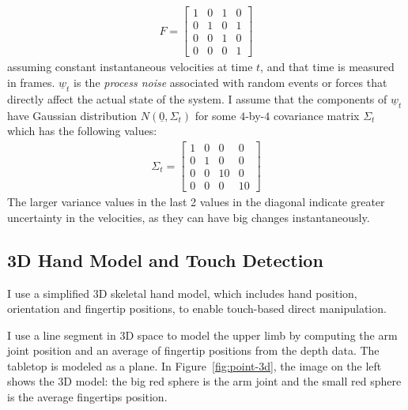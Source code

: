 \begin{align*}
F = \begin{bmatrix}
  1 & 0 & 1 & 0 \\
  0 & 1 & 0 & 1 \\
  0 & 0 & 1 & 0 \\
  0 & 0 & 0 & 1 \end{bmatrix}
\end{align*}
assuming constant instantaneous velocities at time $t$, and that time is
measured in frames.
$\underline{w}_t$ is the \textit{process noise} associated with random events or
forces that directly affect the actual state of the system. I assume that the 
components of $\underline{w}_t$ have Gaussian distribution $N(\underline{0},
\Sigma_t)$ for some $4$-by-$4$ covariance matrix $\Sigma_t$ which has the
following values:
\begin{align*}
\Sigma_t = \begin{bmatrix}
  1 & 0 & 0 & 0 \\
  0 & 1 & 0 & 0 \\
  0 & 0 & 10 & 0 \\
  0 & 0 & 0 & 10 
  \end{bmatrix}
\end{align*}
The larger variance values in the last 2 values in the diagonal indicate
greater uncertainty in the velocities, as they can have big changes
instantaneously.

\subsection{3D Hand Model and Touch Detection}
I use a simplified 3D
skeletal hand model, which includes hand position, orientation and
fingertip positions, to enable touch-based direct manipulation. 

I use a line segment in 3D space to model the upper limb by computing the arm
joint position and an average of fingertip positions from the depth data. The
tabletop is modeled as a plane. In Figure~\ref{fig:point-3d}, the image on the
left shows the 3D model: the big red sphere is the arm joint and the small red
sphere is the average fingertips position. 

